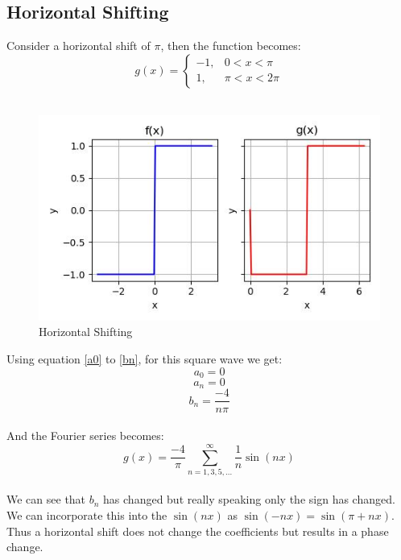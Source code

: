 \documentclass{article}
\begin{document}
\subsection{Horizontal Shifting}
Consider a horizontal shift of $\pi$, then the function becomes:
\begin{equation}
g(x) = 
\begin{cases} 
-1, & 0 < x < \pi \\
1, & \pi < x < 2\pi
\end{cases}
\end{equation}\\
\begin{figure}
    \centering
    \includegraphics[width=\textwidth]{horizontal_shift.jpg}
    \caption{Horizontal Shifting}
    \label{fig:enter-label}
\end{figure}
Using equation \ref{a0} to \ref{bn}, for this square wave we get:
    \begin{equation}
    a_0 = 0
    \end{equation}
    \begin{equation}
    a_n = 0
    \end{equation}
    \begin{equation}
    b_n = \frac{-4}{n\pi}
    \end{equation}\\
And the Fourier series becomes:
\begin{equation}
g(x) = \frac{-4}{\pi} \sum_{n=1,3,5,...}^{\infty} \frac{1}{n} \sin\left(nx\right)
\end{equation}\\
We can see that $b_n$ has changed but really speaking only the sign has changed. We can incorporate this into the $\sin(nx)$ as $\sin(-nx) = \sin(\pi + nx)$. Thus a horizontal shift does not change the coefficients but results in a phase change.
\end{document}
